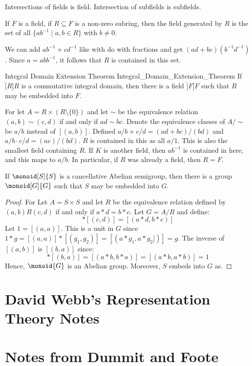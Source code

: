             Intersections of fields is field. Intersection of subfields is
            subfields.
            \begin{theorem}
                If $\ring{F}$ is a field, if $R\subseteq{F}$ is a non-zero
                subring, then the field generated by $R$ is the set of all
                $\{ab^{\minus{1}}\;|\;a,b\in{R}\}$ with $b\ne{0}$.
            \end{theorem}
            We can add $ab^{\minus{1}}+cd^{\minus{1}}$ like with do with
            fractions and get $(ad+bc)(b^{\minus{1}}d^{\minus{1}})$.
            Since $a=abb^{\minus{1}}$, it follows that $R$ is contained in
            this set.
            \begin{ftheorem}{Integral Domain Extension Theorem}
                            {Integral_Domain_Extension_Theorem}
                If $\ring[R]{R}$ is a commutative integral domain, then
                there is a field $\ring[F]{F}$ such that $R$ may be
                embedded into $F$.
            \end{ftheorem}
            \begin{bproof}
                For let $A=R\times(R\setminus\{0\})$ and let $\sim$ be the
                equivalence relation $(a,b)\sim(c,d)$ if and only if
                $ad\sim{b}c$. Denote the equivalence classes of
                $A/\sim$ be $a/b$ instead of $[(a,b)]$. Defined
                $a/b+c/d=(ad+bc)/(bd)$ and $a/b\cdot{c}/d=(ac)/(bd)$.
                $R$ is contained in this as all $a/1$. This is also the
                smallest field containing $R$. If $K$ is another field,
                then $ab^{\minus{1}}$ is contained in here, and this maps
                to $a/b$. In particular, if $R$ was already a field, then
                $R=F$.
            \end{bproof}
            \begin{theorem}
                If $\monoid[S]{S}$ is a cancellative Abelian semigroup, then
                there is a group $\monoid[G]{G}$ such that $S$ may be
                embedded into $G$.
            \end{theorem}
            \begin{proof}
                For Let $A=S\times{S}$ and let $R$ be the equivalence
                relation defined by $(a,b)R(c,d)$ if and only if
                $a*d=b*c$. Let $G=A/R$ and define:
                \begin{equation}
                    [(a,b)]*[(c,d)]=[(a*d,b*c)]
                \end{equation}
                Let $1=[(a,a)]$. This is a unit in $G$ since
                $1*g=[(a,a)]*[(g_{1},g_{2})]=[(a*g_{1},a*g_{2}])]=g$.
                The inverse of $[(a,b)]$ is $[(b,a)]$ since:
                \begin{equation}
                    [(a,b)]*[(b,a)]=[(a*b,b*a)]=[(a*b,a*b)]=1
                \end{equation}
                Hence, $\monoid{G}$ is an Abelian group. Moreover, $S$
                embeds into $G$ as.
            \end{proof}
\section{David Webb's Representation Theory Notes}
\section{Notes from Dummit and Foote}
